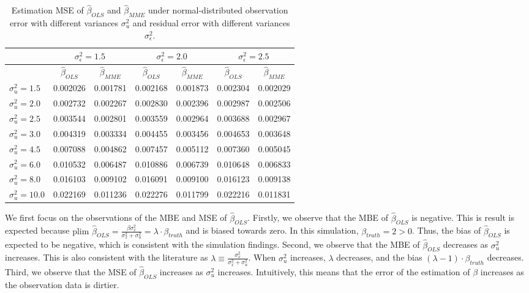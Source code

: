 \documentclass{article}
\begin{document}
\begin{table}[ht]
    \centering
    \caption{Estimation MSE of $\hat{\beta}_{OLS}$ and $\hat{\beta}_{MME}$ under normal-distributed observation error with different variances $\sigma^2_u$ and residual error with different variances $\sigma^2_\epsilon$.}
    \label{Tab:MSE_normal}
    \begin{tabular}[t]{lcccccc}
        \hline
        &\multicolumn{2}{c}{$\sigma^2_\epsilon=1.5$}&\multicolumn{2}{c}{$\sigma^2_\epsilon=2.0$}&\multicolumn{2}{c}{$\sigma^2_\epsilon=2.5$}\\
        \hline
        &$\hat{\beta}_{OLS}$&$\hat{\beta}_{MME}$&$\hat{\beta}_{OLS}$&$\hat{\beta}_{MME}$&$\hat{\beta}_{OLS}$&$\hat{\beta}_{MME}$\\
        \hline
        $\sigma^2_u = 1.5$&0.002026&0.001781&0.002168&0.001873&0.002304&0.002029\\
        $\sigma^2_u = 2.0$&0.002732&0.002267&0.002830&0.002396&0.002987&0.002506\\
        $\sigma^2_u = 2.5$&0.003544&0.002801&0.003559&0.002964&0.003688&0.002967\\
        $\sigma^2_u = 3.0$&0.004319&0.003334&0.004455&0.003456&0.004653&0.003648\\
        $\sigma^2_u = 4.5$&0.007088&0.004862&0.007457&0.005112&0.007360&0.005045\\
        $\sigma^2_u = 6.0$&0.010532&0.006487&0.010886&0.006739&0.010648&0.006833\\
        $\sigma^2_u = 8.0$&0.016103&0.009102&0.016091&0.009100&0.016123&0.009138\\
        $\sigma^2_u = 10.0$&0.022169&0.011236&0.022276&0.011799&0.022216&0.011831\\
        \hline
    \end{tabular}
\end{table}

We first focus on the observations of the MBE and MSE of $\hat{\beta}_{OLS}$.
Firstly, we observe that the MBE of $\hat{\beta}_{OLS}$ is negative.
This is result is expected because $\textrm{plim } \hat{\beta}_{OLS} = \frac{\beta \sigma^2_x}{\sigma^2_x + \sigma^2_u} = \lambda \cdot \beta_{truth}$ and is biased towards zero.
In this simulation, $\beta_{truth} = 2 > 0$.
Thus, the bias of $\hat{\beta}_{OLS}$ is expected to be negative, which is consistent with the simulation findings.
Second, we observe that the MBE of $\hat{\beta}_{OLS}$ decreases as $\sigma^2_u$ increases.
This is also consistent with the literature as $\lambda \equiv \frac{\sigma_x^2}{\sigma_x^2 + \sigma_u^2}$.
When $\sigma^2_u$ increases, $\lambda$ decreases, and the bias $(\lambda-1) \cdot \beta_{truth}$ decreases.
Third, we observe that the MSE of $\hat{\beta}_{OLS}$ increases as $\sigma^2_u$ increases. Intuitively, this means that the error of the estimation of $\beta$ increases as the observation data is dirtier. 
\end{document}

